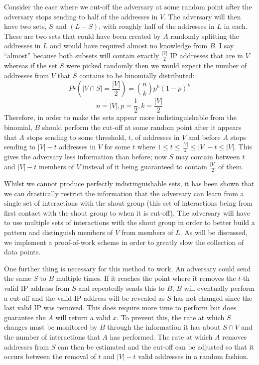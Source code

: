 \documentclass[ %
                    author={Luke Murray},
                supervisor={Dr. Simon Hollis},
                     title={Shadow Peer-to-Peer Networks},
                  subtitle={},
                    degree={MEng},
                      year={2013} ]{thesis}
\begin{document}
Consider the case where we cut-off the adversary at some random point after the adversary stops sending to half of the addresses in $V$. The adversary will then have two sets, $S$ and $(L - S)$, with roughly half of the addresses in $L$ in each. These are two sets that could have been created by $A$ randomly splitting the addresses in $L$ and would have required almost no knowledge from $B$. I say ``almost'' because both subsets will contain exactly $\frac{|V|}{2}$ IP addresses that are in $V$ whereas if the set $S$ were picked randomly then we would expect the number of addresses from $V$ that $S$ contains to be binomially distributed: \[Pr(|V \cap S| = \frac{|V|}{2}) = {n \choose k}p^{k}(1-p)^{k}\]\[n = |V|, p = \frac{1}{2}, k = \frac{|V|}{2}\] Therefore, in order to make the sets appear more indistinguishable from the binomial, $B$ should perform the cut-off at some random point after it appears that $A$ stops sending to some threshold, $t$, of addresses in $V$ and before $A$ stops sending to $|V| - t$ addresses in $V$ for some $t$ where $1 \leq t \leq \frac{|V|}{2} \leq |V| - t \leq |V|$. This gives the adversary less information than before; now $S$ may contain between $t$ and $|V| - t$ members of $V$ instead of it being guaranteed to contain $\frac{|V|}{2}$ of them.

Whilst we cannot produce perfectly indistinguishable sets, it has been shown that we can drastically restrict the information that the adversary can learn from a single set of interactions with the shout group (this set of interactions being from first contact with the shout group to when it is cut-off). The adversary will have to use multiple sets of interactions with the shout group in order to better build a pattern and distinguish members of $V$ from members of $L$. As will be discussed, we implement a proof-of-work scheme in order to greatly slow the collection of data points.

One further thing is necessary for this method to work. An adversary could send the same $S$ to $B$ multiple times. If it reaches the point where it removes the $t$-th valid IP address from $S$ and repeatedly sends this to $B$, $B$ will eventually perform a cut-off and the valid IP address will be revealed as $S$ has not changed since the last valid IP was removed. This does require more time to perform but does guarantee the $A$ will return a valid $x$. To prevent this, the rate at which $S$ changes must be monitored by $B$ through the information it has about $S \cap V$ and the number of interactions that $A$ has performed. The rate at which $A$ removes addresses from $S$ can then be estimated and the cut-off can be adjusted so that it occurs between the removal of $t$ and $|V| - t$ valid addresses in a random fashion.
\end{document}
